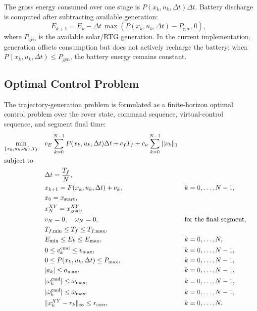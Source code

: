 The gross energy consumed over one stage is $P(x_k,u_k,\Delta t)\Delta t$. Battery discharge is computed after subtracting available generation:
\begin{equation}
    E_{k+1} = E_k - \Delta t\,\max\!\left(P(x_k,u_k,\Delta t)-P_{\mathrm{gen}},0\right),
\end{equation}
where $P_{\mathrm{gen}}$ is the available solar/RTG generation. In the current implementation, generation offsets consumption but does not actively recharge the battery; when $P(x_k,u_k,\Delta t)\leq P_{\mathrm{gen}}$, the battery energy remains constant.

\subsection{Optimal Control Problem}
The trajectory-generation problem is formulated as a finite-horizon optimal control problem over the rover state, command sequence, virtual-control sequence, and segment final time:
\begin{subequations}\label{eq:ocp}
\begin{align}
\min_{\{x_k,u_k,\nu_k\},T_f}\quad
& c_E\sum_{k=0}^{N-1} P(x_k,u_k,\Delta t)\Delta t
 + c_f T_f
 + c_\nu\sum_{k=0}^{N-1}\|\nu_k\|_1
\label{eq:ocp_objective}\\
\intertext{subject to}
& \Delta t = \frac{T_f}{N},
\label{eq:ocp_dt}\\
& x_{k+1}=F(x_k,u_k,\Delta t)+\nu_k, && k=0,\ldots,N-1,
\label{eq:ocp_dynamics}\\
& x_0=x_{\mathrm{start}},
\label{eq:ocp_start}\\
& x_N^{XY}=x_{\mathrm{goal}}^{XY},
\label{eq:ocp_goal}\\
& v_N=0,\quad \omega_N=0, && \text{for the final segment},
\label{eq:ocp_stop}\\
& T_{f,\min}\leq T_f\leq T_{f,\max},
\label{eq:ocp_time_bounds}\\
& E_{\min}\leq E_k\leq E_{\max}, && k=0,\ldots,N,
\label{eq:ocp_energy_bounds}\\
& 0\leq v_k^{\mathrm{cmd}}\leq v_{\max}, && k=0,\ldots,N-1,
\label{eq:ocp_speed_bounds}\\
& 0\leq P(x_k,u_k,\Delta t)\leq P_{\max}, && k=0,\ldots,N-1,
\label{eq:ocp_power_bounds}\\
& |a_k|\leq a_{\max}, && k=0,\ldots,N-1,
\label{eq:ocp_accel_bound}\\
& |\omega_k^{\mathrm{cmd}}|\leq \omega_{\max}, && k=0,\ldots,N-1,
\label{eq:ocp_heading_rate_bound}\\
& |\dot{\omega}_k^{\mathrm{cmd}}|\leq \dot{\omega}_{\max}, && k=0,\ldots,N-1,
\label{eq:ocp_yaw_accel_bound}\\
& \|x_k^{XY}-r_k\|_\infty\leq r_{\mathrm{corr}}, && k=0,\ldots,N.
\label{eq:ocp_corridor}
\end{align}
\end{subequations}

